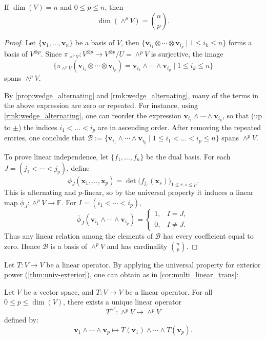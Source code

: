 \begin{proposition}
If $\dim(V) = n$ and $0 \leq p \leq n$, then
\[
\dim(\wedge^p V) = \binom{n}{p}.
\]
\end{proposition}
\begin{proof} 
Let $\{\mathbf{v}_1, \dots, \mathbf{v}_n\}$ be a basis of $V$, then $\{ \mathbf{v}_{i_1} \otimes \cdots \otimes \mathbf{v}_{i_p} \mid 1 \leq i_k \leq n\}$ forms a basis of $V^{\otimes p}$. Since $\pi_{\wedge^p V} : V^{\otimes p} \to V^{\otimes p}/U = \wedge^p V$ is surjective, the image 
\[ 
\{ \pi_{\wedge^pV}(\mathbf{v}_{i_1} \otimes \cdots \otimes \mathbf{v}_{i_p}) = \mathbf{v}_{i_1} \wedge \cdots \wedge \mathbf{v}_{i_p} \mid 1 \leq i_k\leq n \}
\]
spans $\wedge^p V$.
    
By \autoref{prop:wedge_alternating} and \autoref{rmk:wedge_alternating}, many of the terms in the above expression are zero or repeated. For instance, using \autoref{rmk:wedge_alternating}, one can reorder the expression $\mathbf{v}_{i_1} \wedge \cdots \wedge \mathbf{v}_{i_p}$, so that (up to $\pm$) the indices
$i_1 < \dots < i_p$ are in ascending order. 
After removing the repeated entries, one conclude that
$\mathcal{B} := \{ \mathbf{v}_{i_1} \wedge \cdots \wedge \mathbf{v}_{i_p} \mid 1 \leq i_1 < \dots < i_p \leq n\}$
spans $\wedge^pV.$

To prove linear independence, let $\{f_1,\dots,f_n\}$ be the dual basis. For each $J=(j_1<\cdots<j_p)$, define
\[
\phi_J(\mathbf{x}_1,\dots,\mathbf{x}_p)
=
\det\bigl(f_{j_r}(\mathbf{x}_s)\bigr)_{1\leq r,s\leq p}.
\]
This is alternating and $p$-linear, so by the universal property it induces a linear map
$\overline\phi_J:\wedge^pV\to\mathbb F$. For $I=(i_1<\cdots<i_p)$,
\[
\overline\phi_J(\mathbf v_{i_1}\wedge\cdots\wedge\mathbf v_{i_p})
=
\begin{cases}
1,& I=J,\\
0,& I\neq J.
\end{cases}
\]
Thus any linear relation among the elements of $\mathcal B$ has every coefficient equal to zero. Hence $\mathcal{B}$ is a basis of $\wedge^pV$ and has cardinality $\binom{n}{p}$.
\end{proof}

Let $T: V \to V$ be a linear operator. By applying the universal property for exterior power (\autoref{thm:univ-exterior}), one can obtain as in \autoref{cor:multi_linear_trans}:
\begin{corollary} \label{cor:exterior_transformation}
Let $V$ be a vector space, and $T:V \to V$ be a linear operator. For all $0 \leq p \leq \dim(V)$, there exists a unique linear operator
  \[
  T^{\wedge^p} : \wedge^p V \to \wedge^p V
  \]
defined by:
  \[
  \mathbf{v}_1 \wedge \cdots \wedge \mathbf{v}_p \mapsto T(\mathbf{v}_1) \wedge \cdots \wedge T(\mathbf{v}_p).
  \]
\end{corollary}



